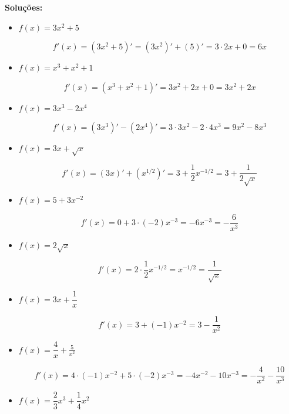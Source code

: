 \documentclass[12pt,openright,twoside,a4paper]{article}
\theoremstyle{definition}
\begin{document}
	\textbf{Soluções:}
	\begin{itemize}
		\item[a)] \(f(x) = 3x^2 + 5\)  
		
		
		\[
		f'(x)
		= (3x^2 + 5)'
		= (3x^2)' + (5)'
		= 3\cdot 2x + 0
		= 6x
		\]
		
		
		
		\item[b)] \(f(x) = x^3 + x^2 + 1\)  
		
		
		\[
		f'(x)
		= (x^3 + x^2 + 1)'
		= 3x^2 + 2x + 0
		= 3x^2 + 2x
		\]
		
		
		
		\item[c)] \(f(x) = 3x^3 - 2x^4\)  
		
		
		\[
		f'(x)
		= (3x^3)' - (2x^4)'
		= 3\cdot 3x^2 - 2\cdot 4x^3
		= 9x^2 - 8x^3
		\]
		
		
		
		\item[d)] \(f(x) = 3x + \sqrt{x}\)  
		
		
		\[
		f'(x)
		= (3x)' + (x^{1/2})'
		= 3 + \dfrac{1}{2} x^{-1/2}
		= 3 + \dfrac{1}{2\sqrt{x}}
		\]
		
		
		
		\item[e)] \(f(x) = 5 + 3x^{-2}\)  
		
		
		\[
		f'(x)
		= 0 + 3\cdot(-2)x^{-3}
		= -6x^{-3}
		= -\dfrac{6}{x^3}
		\]
		
		
		
		\item[f)] \(f(x) = 2\sqrt{x}\)  
		
		
		\[
		f'(x)
		= 2\cdot\dfrac12 x^{-1/2}
		= x^{-1/2}
		= \dfrac{1}{\sqrt{x}}
		\]
		
		
		
		\item[g)] \(f(x) = 3x + \dfrac{1}{x}\)  
		
		
		\[
		f'(x)
		= 3 + (-1)x^{-2}
		= 3 - \dfrac{1}{x^2}
		\]
		
		
		
		\item[h)] \(f(x) = \dfrac{4}{x} + \tfrac{5}{x^2}\)  
		
		
		\[
		f'(x)
		= 4\cdot(-1)x^{-2} + 5\cdot(-2)x^{-3}
		= -4x^{-2} - 10x^{-3}
		= -\dfrac{4}{x^2} - \dfrac{10}{x^3}
		\]
		
		
		
		\item[i)] \(f(x) = \dfrac{2}{3}x^3 + \dfrac{1}{4}x^2\)  
		

\end{itemize}
\end{document}
